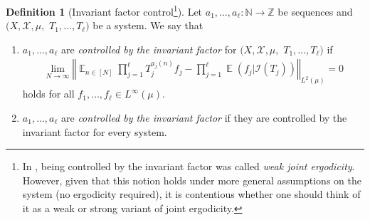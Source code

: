 \documentclass[11pt]{amsart}
\theoremstyle{definition}
\newtheorem{definition}[lemma]{Definition}
\DeclareMathOperator*{\E}{\mathbb{E}}
\newcommand{\N}{{\mathbb N}}
\newcommand{\Z}{{\mathbb Z}}
\newcommand{\CI}{{\mathcal I}}
\newcommand{\CX}{{\mathcal X}}
\newcommand{\norm}[1]{\left\Vert #1\right\Vert}
\newcommand{\1}{{\mathbf{1}}}
\newcommand{\floor}[1]{{\left \lfloor #1 \right \rfloor}}
\begin{document}
\begin{definition}[Invariant factor control\footnote{In \cite{FrKu22b}, being controlled by the invariant factor was called \emph{weak joint ergodicity}. However, given that this notion holds under more general assumptions on the system (no ergodicity required), it is contentious whether one should think of it as a weak or strong variant of joint ergodicity.}]\label{D: invariant control}
        Let $a_1, \ldots, a_\ell:\N\to\Z$ be sequences and $(X, \CX, \mu,$\! $T_1, \ldots, T_\ell)$ be a system. We say that 
\begin{enumerate}
    \item  $a_1, \ldots, a_\ell$ are \emph{controlled by the invariant factor} for $(X, \CX, \mu,$\! $T_1, \ldots, T_\ell)$ if
    \begin{align}\label{E: weak joint ergodicity}
        \lim_{N\to\infty}\norm{\E_{n\in[N]}\prod_{j=1}^\ell T_j^{{a_{j}(n)}}f_j - \prod_{j=1}^\ell \E(f_j|\CI(T_j))}_{L^2(\mu)} = 0
    \end{align}
    holds for all $f_1, \ldots, f_\ell\in L^\infty(\mu)$.
     \item  $a_1, \ldots, a_\ell$ are \emph{controlled by the invariant factor} if they are controlled by the invariant factor for every system.
\end{enumerate}
\end{definition}
\end{document}
